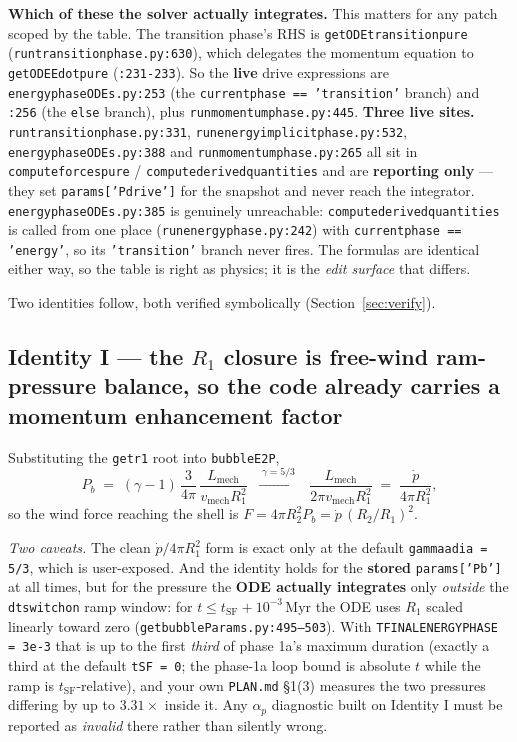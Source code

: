 \documentclass[11pt,a4paper,oneside]{report}
\newcommand{\brkus}{\textunderscore\allowbreak}
\newcommand{\code}[1]{\texttt{\small\let\_\brkus #1}}
\newcommand{\pdotw}{\dot p}
\newcommand{\ap}{\alpha_p}
\newcommand{\Pb}{P_{b}}
\newcommand{\up}[1]{\textcolor{tqaccent}{\textbf{#1}}}
\newcommand{\dn}[1]{\textcolor{tqblue}{\textbf{#1}}}
\begin{document}
\begin{keybox}
\textbf{\sffamily Which of these the solver actually integrates.} This matters for any patch scoped
by the table. The transition phase's RHS is \code{get\_ODE\_transition\_pure}
(\code{run\_transition\_phase.py:630}), which delegates the momentum equation to
\code{get\_ODE\_Edot\_pure} (\code{:231-233}). So the \up{live} drive expressions are
\code{energy\_phase\_ODEs.py:253} (the \code{current\_phase == 'transition'} branch) and \code{:256}
(the \code{else} branch), plus \code{run\_momentum\_phase.py:445}. \up{Three live sites.}
\code{run\_transition\_phase.py:331}, \code{run\_energy\_implicit\_phase.py:532},
\code{energy\_phase\_ODEs.py:388} and \code{run\_momentum\_phase.py:265} all sit in
\code{compute\_forces\_pure} / \code{compute\_derived\_quantities} and are \dn{reporting only} ---
they set \code{params['P\_drive']} for the snapshot and never reach the integrator.
\code{energy\_phase\_ODEs.py:385} is genuinely unreachable: \code{compute\_derived\_quantities} is
called from one place (\code{run\_energy\_phase.py:242}) with \code{current\_phase == 'energy'}, so
its \code{'transition'} branch never fires. The formulas are identical either way, so the table is
right as physics; it is the \emph{edit surface} that differs.
\end{keybox}

Two identities follow, both verified symbolically (Section~\ref{sec:verify}).

\subsection*{Identity I --- the $R_1$ closure is free-wind ram-pressure balance, so the
code already carries a momentum enhancement factor}

Substituting the \code{get\_r1} root into \code{bubble\_E2P},
\[
\Pb \;=\; (\gamma-1)\,\frac{3}{4\pi}\,\frac{L_{\mathrm{mech}}}{v_{\mathrm{mech}}R_1^2}
\;\;\xrightarrow{\;\gamma=5/3\;}\;\;
\frac{L_{\mathrm{mech}}}{2\pi v_{\mathrm{mech}}R_1^2}\;=\;\frac{\pdotw}{4\pi R_1^2},
\]
so the wind force reaching the shell is
$F = 4\pi R_2^2 \Pb = \pdotw\,(R_2/R_1)^2$.

\medskip
\emph{Two caveats.} The clean $\pdotw/4\pi R_1^2$ form is exact only at the default
\code{gamma\_adia = 5/3}, which is user-exposed. And the identity holds for the
\up{stored} \code{params['Pb']} at all times, but for the pressure the \up{ODE actually
integrates} only \emph{outside} the \code{dt\_switchon} ramp window: for
$t \le t_{\mathrm{SF}}+10^{-3}$\,Myr the ODE uses $R_1$ scaled linearly toward zero
(\code{get\_bubbleParams.py:495--503}). With \code{TFINAL\_ENERGY\_PHASE = 3e-3} that is up
to the first \emph{third} of phase 1a's maximum duration (exactly a third at the default
\code{tSF = 0}; the phase-1a loop bound is absolute $t$ while the ramp is $t_{\mathrm{SF}}$-relative),
and your own \code{PLAN.md} \S1(3) measures the two pressures differing by up to $3.31\times$
inside it. Any $\ap$ diagnostic
built on Identity I must be reported as \emph{invalid} there rather than silently wrong.
\end{document}
